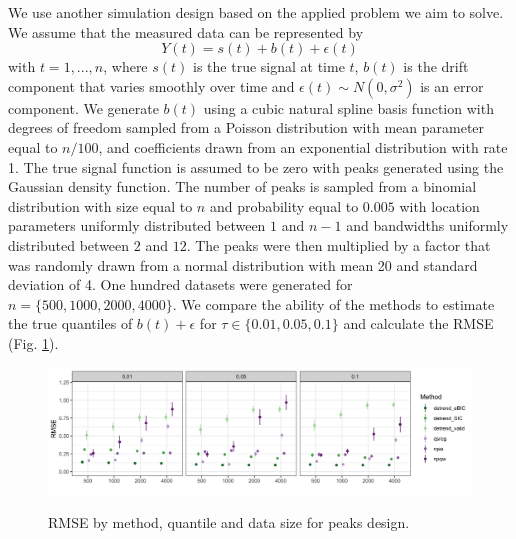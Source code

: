\documentclass[12pt]{article}
\begin{document}
	We use another simulation design based on the applied problem we aim to solve. We assume that the measured data can be represented by 
	\begin{equation}
	Y(t) = s(t) + b(t) + \epsilon(t)
	\end{equation} 
	with $t = 1, ..., n$, where $s(t)$ is the true signal at time $t$, $b(t)$ is the drift component that varies smoothly over time and $\epsilon(t) \sim N(0, \sigma^2)$ is an error component. We generate $b(t)$ using a cubic natural spline basis function with degrees of freedom sampled from a Poisson distribution with mean parameter equal to $n/100$,  and coefficients drawn from an exponential distribution with rate 1. The true signal function is assumed to be zero with peaks generated using the Gaussian density function. The number of peaks is sampled from a binomial distribution with size equal to $n$ and probability equal to $0.005$ with location parameters uniformly distributed between $1$ and $n-1$ and bandwidths uniformly distributed between $2$ and $12$. The peaks were then multiplied by a factor that was randomly drawn from a normal distribution with mean 20 and standard deviation of 4. One hundred datasets were generated for $n=\{500, 1000, 2000, 4000\}$. We compare the ability of the methods to estimate the true quantiles of $b(t) + \epsilon$  for $\tau \in \{0.01, 0.05, 0.1\}$ and calculate the RMSE (Fig. \ref{fig:peaks_rmse}). 	
	\begin{figure}
		\caption{RMSE by method, quantile and data size for peaks design.}
		\includegraphics[width = \linewidth]{Figures/peaks_mse.png}	
		\label{fig:peaks_rmse}
	\end{figure}
	
\end{document}
